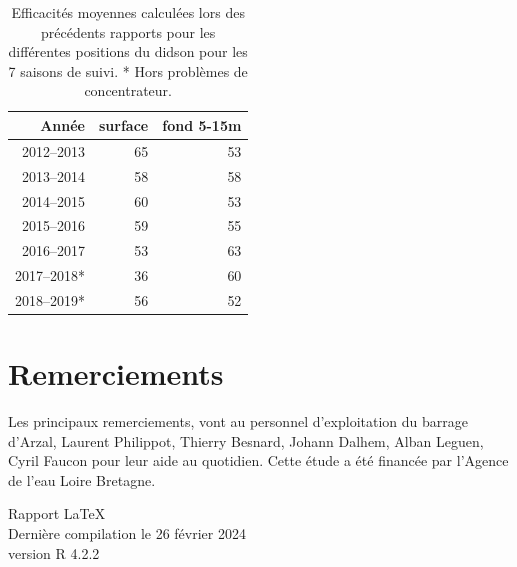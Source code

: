 \documentclass[11pt,twocolumn,titlepage,twoside]{article}
\begin{document}
 \begin{table}[htbp]
\centering
\caption[Efficacités moyennes historiques]{Efficacités moyennes calculées lors
des précédents rapports pour les différentes positions du didson pour les 7 saisons
de suivi. * Hors problèmes de concentrateur.}
\label{tab_efficacite_historique}
\begin{tabular}{rrr}
  \hline
 Année & surface & fond 5-15m  \\ 
  \hline
2012--2013 & 65 & 53\\ 
2013--2014 & 58 & 58\\ 
2014--2015 & 60 & 53\\ 
2015--2016 & 59 & 55\\
2016--2017 & 53 & 63\\
2017--2018* & 36 & 60\\
2018--2019* & 56 & 52\\
   \hline
\end{tabular}
\end{table}





\clearpage %
\twocolumn

\printbibliography

\nul
\vfill
\section*{Remerciements}
Les principaux remerciements, vont au personnel
d'exploitation du barrage d'Arzal, Laurent Philippot, Thierry
Besnard, Johann Dalhem, Alban Leguen, Cyril Faucon pour leur
aide au quotidien.
Cette étude a été financée par l'Agence de l'eau Loire
Bretagne.


\begin{center}
   Rapport \LaTeX \\
   Dernière compilation le 26 février 2024\\
version R 4.2.2 
\end{center}
\end{document}
